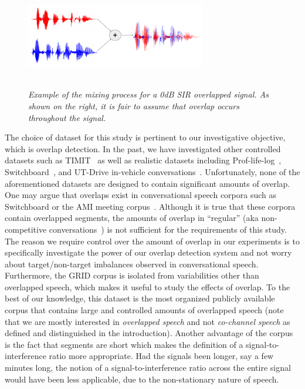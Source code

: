 \vspace{0mm}
\begin{figure}[h!]
	\centering
	\includegraphics[height =1.8in, width=0.7\textwidth]{figures/GRID_example_overlap-crop}
	\vspace{-2mm}
	\caption{\it 
		Example of the mixing process for a 0dB SIR overlapped signal. As shown on the right, it is fair to assume that overlap occurs throughout the signal.}
	\label{fig:overlap_example}
\end{figure}

The choice of dataset for this study is pertinent to our investigative objective, which is overlap detection. 
In the past, we have investigated other controlled datasets such as TIMIT~\cite{nav_icassp13} as well as realistic datasets including Prof-life-log~\cite{ziaei2013prof,nav_icassp15}, Switchboard~\cite{shokouhi2015}, and UT-Drive in-vehicle conversations~\cite{sathyanarayana2013belt}. 
Unfortunately, none of the aforementioned datasets are designed to contain significant amounts of overlap. 
One may argue that overlaps exist in conversational speech corpora such as Switchboard or the AMI meeting corpus~\cite{amicorpus}. 
Although it is true that these corpora contain overlapped segments, the amounts of overlap in ``regular'' (aka non-competitive conversations~\cite{schegloff2000overlapping}) is not sufficient for the requirements of this study. 
The reason we require control over the amount of overlap in our experiments is to specifically investigate the power of our overlap detection system and not worry about target/non-target imbalances observed in conversational speech. 
Furthermore, the GRID corpus is isolated from variabilities other than overlapped speech, which makes it useful to study the effects of overlap. 
To the best of our knowledge, this dataset is the most organized publicly available corpus that contains large and controlled amounts of overlapped speech (note that we are mostly interested in {\it overlapped speech} and not {\it co-channel speech} as defined and distinguished in the introduction). 
Another advantage of the corpus is the fact that segments are short which makes the definition of a signal-to-interference ratio more appropriate. Had the signals been longer, say a few minutes long, the notion of a signal-to-interference ratio across the entire signal would have been less applicable, due to the non-stationary nature of speech. 

